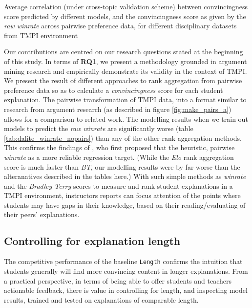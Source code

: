 \documentclass[notitlepage,12pt]{jedm}
\begin{document}
\begin{table}
	\parbox{.45\linewidth}{
		\centering
		
	}
	\hfill
	\parbox{.45\linewidth}{
	\centering
		
	}
	\caption{
		Average correlation (under cross-topic validation scheme) between 
		convincingness score predicted by different models, and the 
		convincingness score as given by the \textit{raw winrate} across 
		pairwise preference data, for different disciplinary datasets from TMPI 
		environment
	}
	\label{tab:dalite_winrate_nopairs}
\end{table}

Our contributions are centred on our research questions stated at the beginning 
of this study. 
In terms of \textbf{RQ1}, we present a methodology grounded in argument mining 
research and empirically demonstrate its validity in the context of TMPI.
We present the result of different approaches to rank aggregation from pairwise 
preference data so as to calculate a \textit{convincingness} score for each 
student explanation.
The pairwise transformation of TMPI data, into a format similar to research 
from argument research (as described in figure \ref{fig:make_pairs_a}) allows 
for a comparison to related work. 
The modelling results when we train out models to predict the \textit{raw 
winrate} are significantly worse (table \ref{tab:dalite_winrate_nopairs}) than 
any of the other rank aggregation methods.
This confirms the findings of \cite{potash_ranking_2019}, who first proposed 
that the heuristic, pairwise \textit{winrate} as a more reliable regression 
target.
(While the \textit{Elo} rank aggregation score is much faster than \textit{BT}, 
our modelling results were by far worse than the alteranatives described in the 
tables here.)
With such simple methods as \textit{winrate} and the \textit{Bradley-Terry} 
scores to measure and rank student explanations in a TMPI environment, 
instructors reports can focus attention of the points where students may have 
gaps in their knowledge, based on their reading/evaluating of their peers' 
explanations.


\subsection{Controlling for explanation length}

The competitive performance of the baseline \verb|Length| confirms the 
intuition that students generally will find more convincing content in longer 
explanations.
From a practical perspective, in terms of being able to offer students and 
teachers actionable feedback, there is value in controlling for length, and 
inspecting model results, trained and tested on explanations of comparable 
length.
\end{document}
